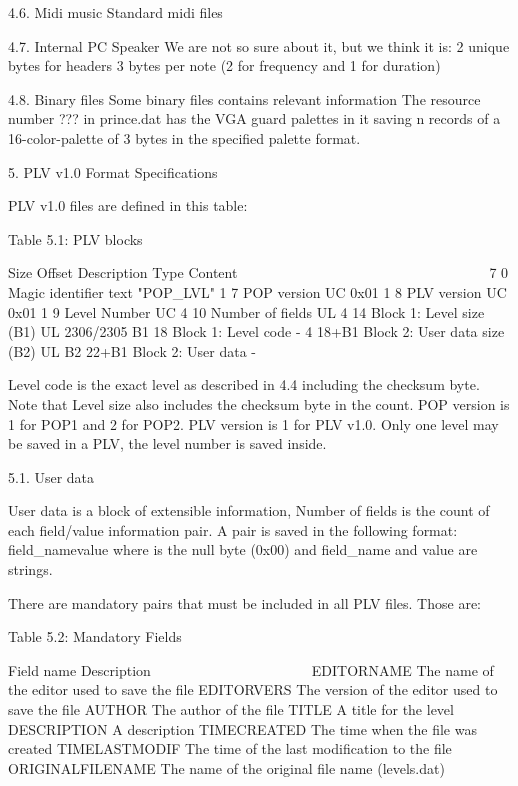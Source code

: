 4.6. Midi music
 Standard midi files

4.7. Internal PC Speaker
 We are not so sure about it, but we think it is:
  2 unique bytes for headers
  3 bytes per note (2 for frequency and 1 for duration)

4.8. Binary files
 Some binary files contains relevant information
 The resource number ??? in prince.dat has the VGA guard palettes in it
 saving n records of a 16-color-palette of 3 bytes in the specified palette
 format.


5. PLV v1.0 Format Specifications
   ~~~ ~~~~ ~~~~~~ ~~~~~~~~~~~~~~

 PLV v1.0 files are defined in this table:

                   Table 5.1: PLV blocks
                   ~~~~~~~~~~~~~~~~~~~~~

   Size Offset Description                  Type   Content
   ~~~~ ~~~~~~ ~~~~~~~~~~~                  ~~~~   ~~~~~~~
      7      0 Magic identifier             text   "POP_LVL"
      1      7 POP version                  UC     0x01
      1      8 PLV version                  UC     0x01
      1      9 Level Number                 UC
      4     10 Number of fields             UL
      4     14 Block 1: Level size (B1)     UL     2306/2305
     B1     18 Block 1: Level code          -
      4  18+B1 Block 2: User data size (B2) UL
     B2  22+B1 Block 2: User data           -

 Level code is the exact level as described in 4.4 including the checksum
 byte. Note that Level size also includes the checksum byte in the count.
 POP version is 1 for POP1 and 2 for POP2.
 PLV version is 1 for PLV v1.0.
 Only one level may be saved in a PLV, the level number is saved inside.

5.1. User data

 User data is a block of extensible information, Number of fields is the
 count of each field/value information pair. A pair is saved in the
 following format:
  field_name\0value\0
 where \0 is the null byte (0x00) and field_name and value are strings.

 There are mandatory pairs that must be included in all PLV files.
 Those are:

                   Table 5.2: Mandatory Fields
                   ~~~~~~~~~~~~~~~~~~~~~~~~~~~

  Field name          Description
  ~~~~~~~~~~          ~~~~~~~~~~~
  EDITORNAME          The name of the editor used to save the file
  EDITORVERS          The version of the editor used to save the file
  AUTHOR              The author of the file
  TITLE               A title for the level
  DESCRIPTION         A description
  TIMECREATED         The time when the file was created
  TIMELASTMODIF       The time of the last modification to the file
  ORIGINALFILENAME    The name of the original file name (levels.dat)

